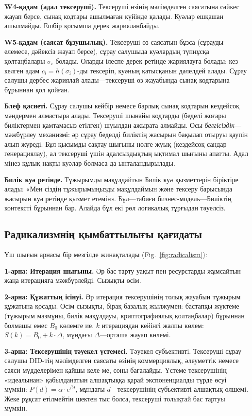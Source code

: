 \documentclass[11pt,a4paper,twocolumn]{article}
\begin{document}
\textbf{W4-қадам (адал тексеруші).} Тексеруші өзінің мәлімделген саясатына сәйкес жауап берсе, сынақ кодтары ашылмаған күйінде қалады. Куәлар ешқашан ашылмайды. Ешбір қосымша дерек жарияланбайды.

\textbf{W5-қадам (саясат бұзушылық).} Тексеруші өз саясатын бұзса (сұрауды елемесе, дәйексіз жауап берсе), сұрау салушыда куәлардың түпнұсқа қолтаңбалары $\sigma_i$ болады. Оларды ілеспе дерек ретінде жариялауға болады: кез келген адам $c_i = h(\sigma_i)$-ды тексеріп, куәның қатысқанын дәлелдей алады. Сұрау салушы дербес жариялай алады---тексеруші өз жауабында сынақ кодтарына бұрыннан қол қойған.

\textbf{Блеф қасиеті.} Сұрау салушы кейбір немесе барлық сынақ кодтарын кездейсоқ мәндермен алмастыра алады. Тексеруші шынайы кодтарды (беделі жоғары биліктермен қамтамасыз етілген) шуылдан ажырата алмайды. Осы \emph{белгісіздік}---мәжбүрлеу механизмі: әр сұрау беделді биліктің жасырын бақылап отыруы қаупін алып жүреді. Бұл қысымды сақтау шығыны нөлге жуық (кездейсоқ сандар генерациялау), ал тексеруші үшін адалсыздықтың ықтимал шығыны апатты. Адал мінез-құлық нақты куәлар болмаса да ынталандырылады.

\textbf{Билік куә ретінде.} Тұжырымды мақұлдайтын Билік куә қызметтерін біріктіре алады: «Мен сіздің тұжырымыңызды мақұлдаймын және тексеру барысында жасырын куә ретінде қызмет етемін». Бұл---табиғи бизнес-модель---Биліктің контексті бұрыннан бар. Алайда бұл екі рөл логикалық тұрғыдан тәуелсіз.

\subsection{Радикализмнің қымбаттылығы қағидаты}

Үш шығын арнасы бір мезгілде жинақталады (Fig.~\ref{fig:radicalism}):

\textbf{1-арна: Итерация шығыны.} Әр бас тарту уақыт пен ресурстарды жұмсайтын жаңа итерацияға мәжбүрлейді. Сызықты өсім.

\textbf{2-арна: Құжаттың ісінуі.} Әр итерация тексерушінің толық жауабын тұжырым құжатына қосады. Өсім сызықты, бірақ базалық жылжумен: бастапқы жүктеме (тұжырым мазмұны, билік мақұлдауы, криптографиялық қолтаңбалар) бұрыннан болмашы емес $B_0$ көлемге ие. $k$ итерациядан кейінгі жалпы көлем: $S(k) = B_0 + k \cdot \Delta$, мұндағы $\Delta$---орташа жауап көлемі.

\textbf{3-арна: Тексерушінің тәуекел үстемесі.} Тәуекел субъективті. Тексеруші сұрау салушы DID-тің мәлімделген саясаты өзінің коммерциялық, әлеуметтік немесе саяси мүдделерімен қайшы келе ме, соны бағалайды. Үстеме тексерушінің «идеалынан» қабылданатын алшақтыққа қарай экспоненциалды түрде өсуі мүмкін: $P(d) = \alpha \cdot e^{\beta d}$, мұндағы $d$---тексерушінің субъективті алшақтық өлшемі. Жеке рұқсат етілмейтін шектен тыс болса, тексеруші толықтай бас тартуы мүмкін.
\end{document}
